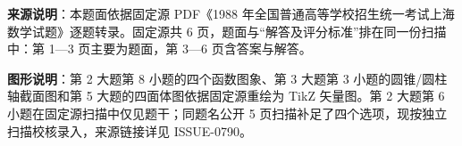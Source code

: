 


\begin{gktip}
\textbf{来源说明}：本题面依据固定源 PDF《1988 年全国普通高等学校招生统一考试上海数学试题》逐题转录。固定源共 6 页，题面与“解答及评分标准”排在同一份扫描中：第 1—3 页主要为题面，第 3—6 页含答案与解答。

\textbf{图形说明}：第 2 大题第 8 小题的四个函数图象、第 3 大题第 3 小题的圆锥/圆柱轴截面图和第 5 大题的四面体图依据固定源重绘为 TikZ 矢量图。第 2 大题第 6 小题在固定源扫描中仅见题干；同题名公开 5 页扫描补足了四个选项，现按独立扫描校核录入，来源链接详见 ISSUE-0790。
\end{gktip}

